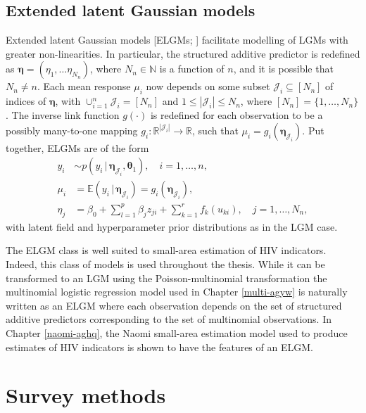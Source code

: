 \documentclass[a4paper, nobind]{templates/ociamthesis}
\begin{document}
\hypertarget{extended-latent-gaussian-models}{%
\subsection{Extended latent Gaussian models}\label{extended-latent-gaussian-models}}

Extended latent Gaussian models {[}ELGMs; \textcite{stringer2021fast}{]} facilitate modelling of LGMs with greater non-linearities.
In particular, the structured additive predictor is redefined as \(\boldsymbol{\mathbf{\eta}} = (\eta_1, \ldots \eta_{N_n})\), where \(N_n \in \mathbb{N}\) is a function of \(n\), and it is possible that \(N_n \neq n\).
Each mean response \(\mu_i\) now depends on some subset \(\mathcal{J}_i \subseteq [N_n]\) of indices of \(\boldsymbol{\mathbf{\eta}}\), with \(\cup_{i = 1}^n \mathcal{J}_i = [N_n]\) and \(1 \leq |\mathcal{J}_i| \leq N_n\), where \([N_n] = \{1, \ldots, N_n\}\).
The inverse link function \(g(\cdot)\) is redefined for each observation to be a possibly many-to-one mapping \(g_i: \mathbb{R}^{|\mathcal{J}_i|} \to \mathbb{R}\), such that \(\mu_i = g_i(\boldsymbol{\mathbf{\eta}}_{\mathcal{J}_i})\).
Put together, ELGMs are of the form
\begin{align*}
y_i &\sim p(y_i \, | \, \boldsymbol{\mathbf{\eta}}_{\mathcal{J}_i}, \boldsymbol{\mathbf{\theta}}_1), \quad i = 1, \ldots, n, \\
\mu_i &= \mathbb{E}(y_i \, | \, \boldsymbol{\mathbf{\eta}}_{\mathcal{J}_i}) = g_i(\boldsymbol{\mathbf{\eta}}_{\mathcal{J}_i}), \\
\eta_j &= \beta_0 + \sum_{l = 1}^{p} \beta_j z_{ji} + \sum_{k = 1}^{r} f_k(u_{ki}), \quad j = 1, \ldots, N_n,
\end{align*}
with latent field and hyperparameter prior distributions as in the LGM case.

The ELGM class is well suited to small-area estimation of HIV indicators.
Indeed, this class of models is used throughout the thesis.
While it can be transformed to an LGM using the Poisson-multinomial transformation \autocite{baker1994multinomial} the multinomial logistic regression model used in Chapter \ref{multi-agyw} is naturally written as an ELGM where each observation depends on the set of structured additive predictors corresponding to the set of multinomial observations.
In Chapter \ref{naomi-aghq}, the Naomi small-area estimation model used to produce estimates of HIV indicators is shown to have the features of an ELGM.

\hypertarget{survey}{%
\section{Survey methods}\label{survey}}
\end{document}
